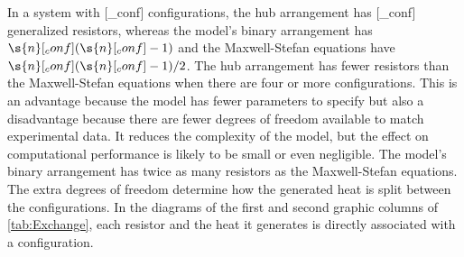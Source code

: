In a system with [_conf] configurations, the hub arrangement has [_conf] generalized resistors, whereas the model's binary arrangement has $\s{n}[_conf](\s{n}[_conf] - 1)$ and the Maxwell-Stefan equations have $\s{n}[_conf](\s{n}[_conf] - 1)/2$.  The hub arrangement has fewer resistors than the Maxwell-Stefan equations when there are four or more configurations.  This is an advantage because the model has fewer parameters to specify but also a disadvantage because there are fewer degrees of freedom available to match experimental data.  It reduces the complexity of the model, but the effect on computational performance is likely to be small or even negligible.  The model's binary arrangement has twice as many resistors as the Maxwell-Stefan equations.  The extra degrees of freedom determine how the generated heat is split between the configurations.  In the diagrams of the first and second graphic columns of \autoref{tab:Exchange}, each resistor and the heat it generates is directly associated with a configuration.

